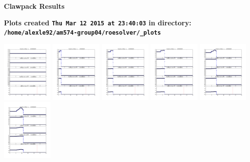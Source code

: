 \documentclass[11pt]{article}
\begin{document}
        \begin{center}{\Large\bf Clawpack Results}\vskip 5pt
        
        \bf Plots created {\tt Thu Mar 12 2015 at 23:40:03} in directory: \vskip 5pt
        \verb+/home/alexle92/am574-group04/roesolver/_plots+
        \end{center}
        \vskip 5pt
        \includegraphics[width=0.19\textwidth]{frame0000fig1.png}
\vskip 10pt 
\includegraphics[width=0.19\textwidth]{frame0001fig1.png}
\vskip 10pt 
\includegraphics[width=0.19\textwidth]{frame0002fig1.png}
\vskip 10pt 
\includegraphics[width=0.19\textwidth]{frame0003fig1.png}
\vskip 10pt 
\includegraphics[width=0.19\textwidth]{frame0004fig1.png}
\vskip 10pt 
\includegraphics[width=0.19\textwidth]{frame0005fig1.png}
\end{document}
